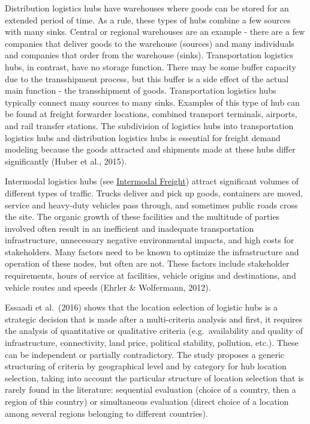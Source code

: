 \documentclass[
]{book}
\begin{document}
Distribution logistics hubs have warehouses where goods can be stored for an extended period of time. As a rule, these types of hubs combine a few sources with many sinks. Central or regional warehouses are an example - there are a few companies that deliver goods to the warehouse (sources) and many individuals and companies that order from the warehouse (sinks). Transportation logistics hubs, in contrast, have no storage function. There may be some buffer capacity due to the transshipment process, but this buffer is a side effect of the actual main function - the transshipment of goods. Transportation logistics hubs typically connect many sources to many sinks. Examples of this type of hub can be found at freight forwarder locations, combined transport terminals, airports, and rail transfer stations. The subdivision of logistics hubs into transportation logistics hubs and distribution logistics hubs is essential for freight demand modeling because the goods attracted and shipments made at these hubs differ significantly (Huber et al., 2015).

Intermodal logistics hubs (see \protect\hyperlink{intermodal_freight}{Intermodal Freight}) attract significant volumes of different types of traffic. Trucks deliver and pick up goods, containers are moved, service and heavy-duty vehicles pass through, and sometimes public roads cross the site. The organic growth of these facilities and the multitude of parties involved often result in an inefficient and inadequate transportation infrastructure, unnecessary negative environmental impacts, and high costs for stakeholders. Many factors need to be known to optimize the infrastructure and operation of these nodes, but often are not. These factors include stakeholder requirements, hours of service at facilities, vehicle origins and destinations, and vehicle routes and speeds (Ehrler \& Wolfermann, 2012).

Essaadi et al.~(2016) shows that the location selection of logistic hubs is a strategic decision that is made after a multi-criteria analysis and first, it requires the analysis of quantitative or qualitative criteria (e.g.~availability and quality of infrastructure, connectivity, land price, political stability, pollution, etc.). These can be independent or partially contradictory. The study proposes a generic structuring of criteria by geographical level and by category for hub location selection, taking into account the particular structure of location selection that is rarely found in the literature: sequential evaluation (choice of a country, then a region of this country) or simultaneous evaluation (direct choice of a location among several regions belonging to different countries).
\end{document}
